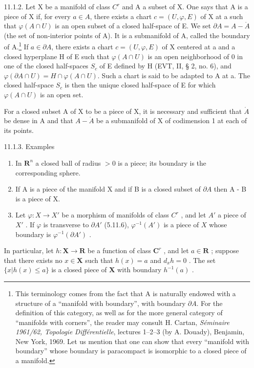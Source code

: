 11.1.2. Let X be a manifold of class \(C^{r}\) and A a subset of X. One says that A is a piece of X if, for every \(a \in A\), there exists a chart \(c = (U, \varphi, E)\) of X at a such that \(\varphi(A \cap U)\) is an open subset of a closed half-space of E. We set \(\partial A = A - \mathring{A}\) (the set of non-interior points of A). It is a submanifold of A, called the boundary of A.\footnote{This terminology comes from the fact that A is naturally endowed with a structure of a “manifold with boundary”, with boundary \(\partial A\). For the definition of this category, as well as for the more general category of “manifolds with corners”, the reader may consult H. Cartan, \emph{Séminaire 1961/62, Topologie Différentielle}, lectures 1–2–3 (by A. Douady), Benjamin, New York, 1969. Let us mention that one can show that every “manifold with boundary” whose boundary is paracompact is isomorphic to a closed piece of a manifold.} If \(a \in \partial A\), there exists a chart \(c = (U, \varphi, E)\) of X centered at a and a closed hyperplane H of E such that \(\varphi(A \cap U)\) is an open neighborhood of 0 in one of the closed half-spaces \(S_{c}\) of E defined by H (EVT, II, § 2, no. 6), and \(\varphi(\partial A \cap U) = H \cap \varphi(A \cap U)\). Such a chart is said to be adapted to A at a. The closed half-space \(S_{c}\) is then the unique closed half-space of E for which \(\varphi(A \cap U)\) is an open set.

For a closed subset A of X to be a piece of X, it is necessary and sufficient that \(\mathring{A}\) be dense in A and that \(A-\mathring{A}\) be a submanifold of X of codimension 1 at each of its points.

11.1.3. Examples

\begin{enumerate}
\def\labelenumi{\alph{enumi})}
\item
  In \(\mathbf{R}^{n}\) a closed ball of radius \(>0\) is a piece; its boundary is the corresponding sphere.
\item
  If A is a piece of the manifold X and if B is a closed subset of \(\partial A\) then A - B is a piece of X.
\item
  Let \(\varphi: X \to X'\) be a morphism of manifolds of class \(C^r\) , and let \(A'\) a piece of \(X'\) . If \(\varphi\) is transverse to \(\partial A'\) (5.11.6), \(\varphi^{-1}(A')\) is a piece of \(X\) whose boundary is \(\varphi^{-1}(\partial A')\) .
\end{enumerate}

In particular, let \(h: \mathbf{X} \to \mathbf{R}\) be a function of class \(\mathbf{C}^r\) , and let \(a \in \mathbf{R}\) ; suppose that there exists no \(x \in \mathbf{X}\) such that \(h(x) = a\) and \(d_x h = 0\) . The set \(\{x | h(x) \leqslant a\}\) is a closed piece of \(\mathbf{X}\) with boundary \(h^{-1}(a)\) .

